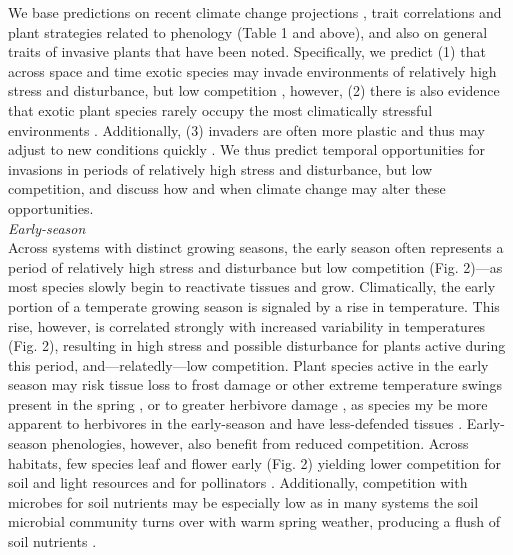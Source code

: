 \documentclass[11pt,a4paper,oneside]{article}
\begin{document}
We base predictions on recent climate change projections \citep{knutti2013}, trait correlations and plant strategies related to phenology (Table 1 and above), and also on general traits of invasive plants that have been noted. Specifically, we predict (1) that across space and time exotic species may invade environments of relatively high stress and disturbance, but low competition \citep[e.g.,][]{rej1996,Gelbard2003}, however, (2) there is also evidence that exotic plant species rarely occupy the most climatically stressful environments \citep{rej1989}. Additionally, (3) invaders are often more plastic and thus may adjust to new conditions quickly \citep{Davidson2011}. We thus predict temporal opportunities for invasions in periods of relatively high stress and disturbance, but low competition, and discuss how and when climate change may alter these opportunities. \\

\noindent \emph{Early-season}\\
\noindent  Across systems with distinct growing seasons, the early season often represents a period of relatively high stress and disturbance but low competition (Fig. 2)---as most species slowly begin to reactivate tissues and grow. Climatically, the early portion of a temperate growing season is signaled by a rise in temperature. This rise, however, is correlated strongly with increased variability in temperatures (Fig. 2), resulting in high stress and possible disturbance for plants active during this period, and---relatedly---low competition. Plant species active in the early season may risk tissue loss to frost damage or other extreme temperature swings present in the spring \citep{Linkosalo2000,Augspurger:2009gj}, or to greater herbivore damage \citep{Lechowicz:1984cr}, as species my be more apparent to herbivores in the early-season \citep{Brody:1997ro} and have less-defended tissues \citep{vanasch2007}. Early-season phenologies, however, also benefit from reduced competition. Across habitats, few species leaf and flower early (Fig. 2) yielding lower competition for soil and light resources and for pollinators \citep{Mosquin1971}. Additionally, competition with microbes for soil nutrients may be especially low as in many systems the soil microbial community turns over with warm spring weather, producing a flush of soil nutrients \citep{Zak:1990ar}. 
\end{document}
